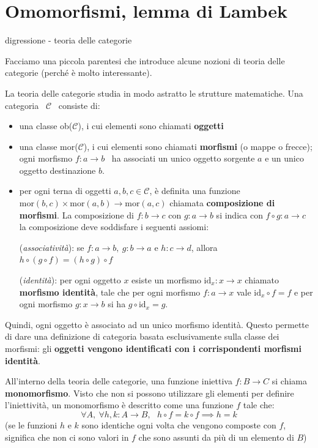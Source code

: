 \documentclass[a4paper,11pt]{report}
\begin{document}
\section{Omomorfismi, lemma di Lambek}
\begin{gframe}{digressione - teoria delle categorie}

    Facciamo una piccola parentesi che introduce alcune nozioni di teoria delle categorie (perché è molto interessante).

    La teoria delle categorie studia in modo astratto le strutture matematiche. Una categoria  \ \( \mathcal{C} \) \ consiste di:
    \begin{itemize}
        \item  una classe ob(\( \mathcal{C} \)), i cui elementi sono chiamati \textbf{oggetti}
        \item  una classe mor(\( \mathcal{C} \)), i cui elementi sono chiamati \textbf{morfismi} (o mappe o frecce); ogni morfismo \( f: a \to b \) \ ha associati un unico oggetto sorgente \( a \) e un unico oggetto destinazione \( b \).
        \item per ogni terna di oggetti \( a, b, c \in \mathcal{C}\), è definita una funzione \( \text{mor}(b, c) \times \text{mor}(a,b) \to \text{mor}(a, c) \) chiamata \textbf{composizione di morfismi}. La composizione di \( f: b \to c \) con \( g: a \to b \) si indica con \( f \circ g: a \to c \)
            \subitem la composizione deve soddisfare i seguenti assiomi:

            (\textit{associatività}): se \( f: a \to b, \ g: b \to a \text{ e } h: c \to d\), allora \( h \circ (g \circ f) = (h \circ g) \circ f \)

            (\textit{identità}): per ogni oggetto \( x \) esiste un morfismo \( \text{id}_x : x \to x \) chiamato \textbf{morfismo identità}, tale che per ogni morfismo \( f: a \to x \) vale \( \text{id}_x \circ f = f \) e per ogni morfismo \( g : x \to b \) si ha \( g \circ \text{id}_x = g \).
    \end{itemize}

    Quindi, ogni oggetto è associato ad un unico morfismo identità. Questo permette di dare una definizione di categoria basata esclusivamente sulla classe dei morfismi: gli \textbf{oggetti vengono identificati con i corrispondenti morfismi identità}.

    All'interno della teoria delle categorie, una funzione iniettiva \( f: B \to C \) si chiama \textbf{monomorfismo}. Visto che non si possono utilizzare gli elementi per definire l'iniettività, un monomorfismo è descritto come una funzione \( f \) tale che:
    \[
        \forall A, \ \forall h, k : A \to B, \ \ \ h \circ f = k \circ f \implies h = k
    \]
    (se le funzioni \( h \) e \( k \) sono identiche ogni volta che vengono composte con \( f \), significa che non ci sono valori in \( f \) che sono assunti da più di un elemento di \( B \))
\end{gframe}
\end{document}
